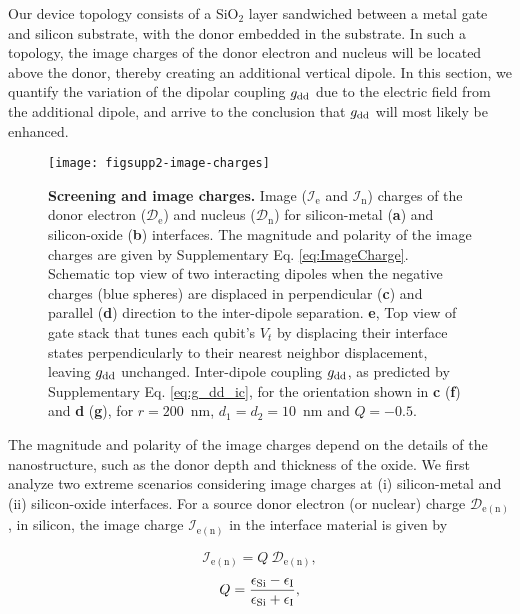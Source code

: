 \documentclass[aps,prb,superscriptaddress,nobibnotes,twocolumn]{revtex4-1}
\begin{document}
Our device topology consists of a SiO$_2$ layer sandwiched between a metal gate and silicon substrate, with the donor embedded in the substrate. In such a topology, the image charges of the donor electron and nucleus will be located above the donor, thereby creating an additional vertical dipole. In this section, we quantify the variation of the dipolar coupling $g_{\rm dd}$ due to the electric field from the additional dipole, and arrive to the conclusion that $g_{\rm dd}$ will most likely be enhanced.

\begin{figure}
\centering
\texttt{[image: figsupp2-image-charges]}
\caption{\textbf{Screening and image charges.} Image ($\mathcal{I}_\mathrm{e}$ and $\mathcal{I}_\mathrm{n}$) charges of the donor electron ($\mathcal{D}_\mathrm{e}$) and nucleus ($\mathcal{D}_\mathrm{n}$) for silicon-metal (\textbf{a}) and silicon-oxide (\textbf{b}) interfaces. The magnitude and polarity of the image charges are given by Supplementary Eq. \ref{eq:ImageCharge}. Schematic top view of two interacting dipoles when the negative charges (blue spheres) are displaced in perpendicular (\textbf{c}) and parallel (\textbf{d}) direction to the inter-dipole separation. \textbf{e}, Top view of gate stack that tunes each qubit's $V_t$ by displacing their interface states perpendicularly to their nearest neighbor displacement, leaving $g_{\rm dd}$ unchanged. Inter-dipole coupling $g_{\rm dd}$, as predicted by Supplementary Eq. \ref{eq:g_dd_ic}, for the orientation shown in \textbf{c} (\textbf{f}) and \textbf{d} (\textbf{g}), for $r=200$~nm, $d_1=d_2=10$~nm and $Q=-0.5$.}
\label{fig:image_charge}
\end{figure}

The magnitude and polarity of the image charges depend on the details of the nanostructure, such as the donor depth and thickness of the oxide. We first analyze two extreme scenarios considering image charges at (i) silicon-metal and (ii) silicon-oxide interfaces. For a source donor electron (or nuclear) charge $\mathcal{D}_\mathrm{e(n)}$, in silicon, the image charge $\mathcal{I}_\mathrm{e(n)}$ in the interface material is given by\cite{Rahman2009S}

\begin{equation} \label{eq:ImageCharge}
\mathcal{I}_\mathrm{e(n)}=Q~\mathcal{D}_\mathrm{e(n)},
\end{equation}
\begin{equation} \label{eq:Q}
Q=\frac{\epsilon_{\rm Si} - \epsilon_{\rm I}}{\epsilon_{\rm Si} + \epsilon_{\rm I}},
\end{equation}
\end{document}
